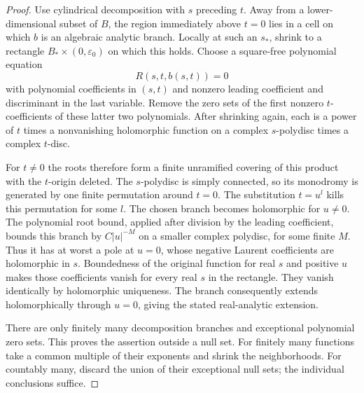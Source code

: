 \begin{proof}
Use cylindrical decomposition with $s$ preceding $t$.  Away from a lower-dimensional subset of $B$, the region immediately above $t=0$ lies in a cell on which $b$ is an algebraic analytic branch.  Locally at such an $s_*$, shrink to a rectangle $B_*\times(0,\varepsilon_0)$ on which this holds.  Choose a square-free polynomial equation
\[
 R(s,t,b(s,t))=0
\]
with polynomial coefficients in $(s,t)$ and nonzero leading coefficient and discriminant in the last variable.  Remove the zero sets of the first nonzero $t$-coefficients of these latter two polynomials.  After shrinking again, each is a power of $t$ times a nonvanishing holomorphic function on a complex $s$-polydisc times a complex $t$-disc.

For $t\ne0$ the roots therefore form a finite unramified covering of this product with the $t$-origin deleted.  The $s$-polydisc is simply connected, so its monodromy is generated by one finite permutation around $t=0$.  The substitution $t=u^l$ kills this permutation for some $l$. The chosen branch becomes holomorphic for $u\ne0$.  The polynomial root bound, applied after division by the leading coefficient, bounds this branch by $C|u|^{-M}$ on a smaller complex polydisc, for some finite $M$. Thus it has at worst a pole at $u=0$, whose negative Laurent coefficients are holomorphic in $s$.  Boundedness of the original function for real $s$ and positive $u$ makes those coefficients vanish for every real $s$ in the rectangle.  They vanish identically by holomorphic uniqueness. The branch consequently extends holomorphically through $u=0$, giving the stated real-analytic extension.

There are only finitely many decomposition branches and exceptional polynomial zero sets.  This proves the assertion outside a null set. For finitely many functions take a common multiple of their exponents and shrink the neighborhoods.  For countably many, discard the union of their exceptional null sets; the individual conclusions suffice.
\end{proof}

